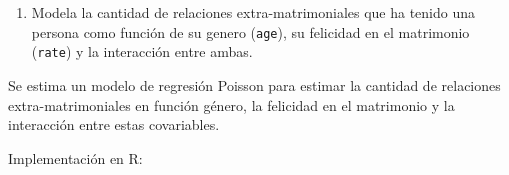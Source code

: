 \documentclass[
  12pt,
  a4paper,
]{article}
\providecommand{\tightlist}{%
  \setlength{\itemsep}{0pt}\setlength{\parskip}{0pt}}
\begin{document}
\begin{table}[h!]
\begin{center}
\caption{\label{tab:table2} Modelo Poisson para tasa de infelidad según tiempo del matrimonio}
\label{table:coefficients}
\end{center}
\end{table}

\begin{enumerate}
\def\labelenumi{\alph{enumi})}
\tightlist
\item
  Modela la cantidad de relaciones extra-matrimoniales que ha tenido una persona como función de su genero (\texttt{age}), su felicidad en el matrimonio (\texttt{rate}) y la interacción entre ambas.
\end{enumerate}

Se estima un modelo de regresión Poisson para estimar la cantidad de relaciones extra-matrimoniales en función género, la felicidad en el matrimonio y la interacción entre estas covariables.

Implementación en R:
\end{document}
